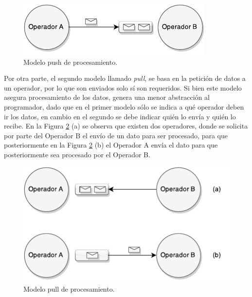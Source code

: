 \begin{figure}[ht!]
  \centering
    \includegraphics[scale=1]{images/SPS-Push.pdf}
  \caption{Modelo push de procesamiento.}
  \label{fig:sps-push}
\end{figure}

Por otra parte, el segundo modelo llamado \textit{pull}, se basa en la petici\'on de datos a un operador, por lo que son enviados solo s\'i son requeridos. Si bien este modelo asegura procesamiento de los datos, genera una menor abstracci\'on al programador, dado que en el primer modelo s\'olo se indica a \normalsize{qu\'e} operador deben ir los datos, en cambio en el segundo se debe indicar qui\'en lo env\'ia y qui\'en lo recibe. En la Figura \ref{fig:sps-pull} (a) se observa que existen dos operadores, donde se solicita por parte del Operador B el env\'io de un dato para ser procesado, para que posteriormente en la Figura \ref{fig:sps-pull} (b) el Operador A env\'ia el dato para que posteriormente sea procesado por el Operador B.

\begin{figure}[ht!]
  \centering
    \includegraphics[scale=1]{images/SPS-Pull.pdf}
  \caption{Modelo pull de procesamiento.}
  \label{fig:sps-pull}
\end{figure}

